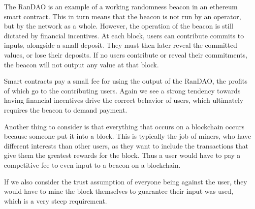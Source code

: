 The RanDAO\cite{randao} is an example of a working randomness beacon in an ethereum smart contract. This in turn means that the beacon is not run by an operator, but by the network as a whole. However, the operation of the beacon is still dictated by financial incentives. At each block, users can contribute commits to inputs, alongside a small deposit. They must then later reveal the committed values, or lose their deposits. If no users contribute or reveal their commitments, the beacon will not output any value at that block.

Smart contracts pay a small fee for using the output of the RanDAO, the profits of which go to the contributing users. Again we see a strong tendency towards having financial incentives drive the correct behavior of users, which ultimately requires the beacon to demand payment.

Another thing to consider is that everything that occurs on a blockchain occurs because someone put it into a block. This is typically the job of miners, who have different interests than other users, as they want to include the transactions that give them the greatest rewards for the block. Thus a user would have to pay a competitive fee to even input to a beacon on a blockchain.

If we also consider the trust assumption of everyone being against the user, they would have to mine the block themselves to guarantee their input was used, which is a very steep requirement.
